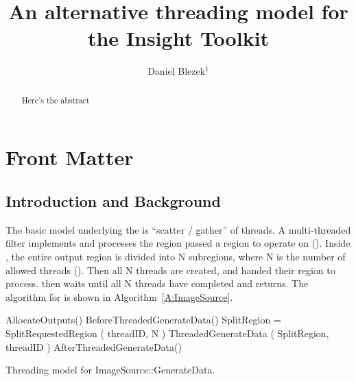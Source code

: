 \documentclass{InsightArticle}
\title{An alternative threading model for the Insight Toolkit}
\author{Daniel Blezek$^{1}$}
\begin{document}
%
% 


\maketitle

\ifhtml
\chapter*{Front Matter\label{front}}
\fi

\begin{abstract}
\noindent
Here's the abstract
\end{abstract}


\tableofcontents
\clearpage
\section{Introduction and Background}
The basic model underlying the  is ``scatter / gather'' of threads.  A multi-threaded filter implements
 and processes the region passed a region to operate on ().  Inside
, the entire output region is divided into N subregions, where N is the number of allowed threads
().  Then all N threads are created, and handed their region to process. 
 then waits until all N threads have completed and returns.  The algorithm for
 is shown in Algorithm~\ref{A:ImageSource}.

\begin{algorithm}
  \begin{algorithmic}
    \STATE AllocateOutputs() 
    \STATE BeforeThreadedGenerateData() 
      \STATE  {}
      \STATE SplitRegion = SplitRequestedRegion ( threadID, N )
      \STATE  {}
      \STATE ThreadedGenerateData ( SplitRegion, threadID )
    \ENDFOR %
    \STATE AfterThreadedGenerateData() 
  \end{algorithmic}
  \caption{Threading model for ImageSource::GenerateData.  \label{A:ImageSource}}
\end{algorithm}
\end{document}
